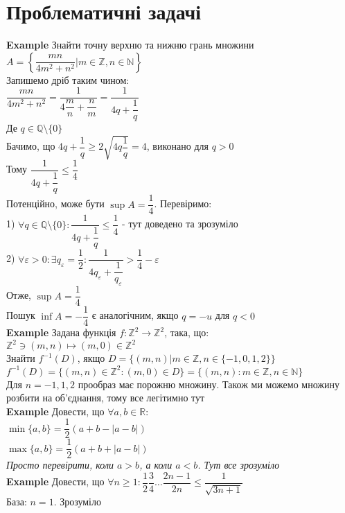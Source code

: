 \documentclass[a4paper, 14pt]{extarticle}
\def\huge{\displaystyle}
\def\bigline{\vspace{5mm}\\}
\def\ex#1{\textbf{Example {#1}}}
\def\bigline{\vspace{5mm}\\}
\begin{document}
\section*{Проблематичні задачі}
\ex{} Знайти точну верхню та нижню грань множини\\
$A = \left\{ \dfrac{mn}{4m^2 + n^2} | m \in \mathbb{Z}, n \in \mathbb{N} \right\}$
\bigline
Запишемо дріб таким чином:\\
$\dfrac{mn}{4m^2 + n^2} = \dfrac{1}{4 \dfrac{m}{n} + \dfrac{n}{m}} = \dfrac{1}{4q + \dfrac{1}{q}}$\\
Де $q \in \mathbb{Q} \setminus \{0\}$\\
Бачимо, що $4q + \dfrac{1}{q} \geq 2 \huge \sqrt{4q \dfrac{1}{q}} = 4$, виконано для $q > 0$\\
Тому $\dfrac{1}{4q + \dfrac{1}{q}} \leq \dfrac{1}{4}$\\
Потенційно, може бути $\sup A = \dfrac{1}{4}$. Перевіримо:\\
1) $\forall q \in \mathbb{Q} \setminus \{0\}: \dfrac{1}{4q + \dfrac{1}{q}} \leq \dfrac{1}{4}$ - тут доведено та зрозуміло\\
2) $\forall \varepsilon > 0: \exists q_{\varepsilon} = \dfrac{1}{2}: \dfrac{1}{4q_{\varepsilon} + \dfrac{1}{q_{\varepsilon}}} > \dfrac{1}{4} - \varepsilon$\\
Отже, $\sup A = \dfrac{1}{4}$\\
Пошук $\inf A = -\dfrac{1}{4}$ є аналогічним, якщо $q = -u$ для $q < 0$
\bigline
\ex{} Задана функція $f: \mathbb{Z}^2 \to \mathbb{Z}^2$, така, що:\\
$\mathbb{Z}^2 \ni (m,n) \mapsto (m,0) \in \mathbb{Z}^2$\\
Знайти $f^{-1}(D)$, якщо $D = \{(m,n)| m \in \mathbb{Z}, n \in \{-1,0,1,2\}\}$
\bigline
$f^{-1}(D) = \{(m,n) \in \mathbb{Z}^2: (m,0) \in D \} = \{(m,n): m \in \mathbb{Z}, n \in \mathbb{N}\}$\\
Для $n=-1,1,2$ прообраз має порожню множину. Також ми можемо множину розбити на об'єднання, тому все легітимно тут
\bigline
\ex{} Довести, що $\forall a,b \in \mathbb{R}:$\\
$\min\{a,b\} = \dfrac{1}{2}(a+b - |a-b|)$\\
$\max\{a,b\} = \dfrac{1}{2}(a+b + |a-b|)$\\
\textit{Просто перевірити, коли $a>b$, а коли $a<b$. Тут все зрозуміло}
\bigline
\ex{} Довести, що $\forall n \geq 1: \dfrac{1}{2} \dfrac{3}{4} \dots \dfrac{2n-1}{2n} \leq \dfrac{1}{\sqrt{3n+1}}$
\bigline
База: $n = 1$. Зрозуміло\\
\end{document}
